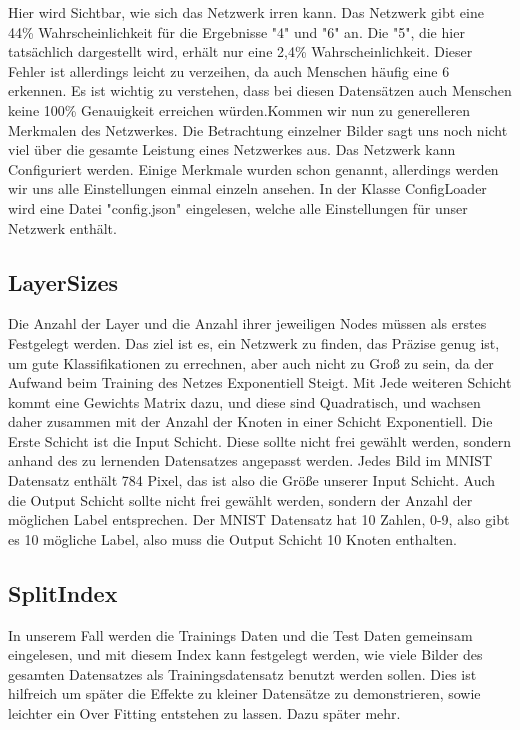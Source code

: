 \documentclass[12pt]{article}
\begin{document}
Hier wird Sichtbar, wie sich das Netzwerk irren kann. Das Netzwerk gibt eine 44\% Wahrscheinlichkeit für die Ergebnisse "4" und "6" an. Die "5", die hier tatsächlich dargestellt wird, erhält nur eine 2,4\% Wahrscheinlichkeit. Dieser Fehler ist allerdings leicht zu verzeihen, da auch Menschen häufig eine 6 erkennen. Es ist wichtig zu verstehen, dass bei diesen Datensätzen auch Menschen keine 100\% Genauigkeit erreichen würden.Kommen wir nun zu generelleren Merkmalen des Netzwerkes. Die Betrachtung einzelner Bilder sagt uns noch nicht viel über die gesamte Leistung eines Netzwerkes aus. Das Netzwerk kann Configuriert werden. Einige Merkmale wurden schon genannt, allerdings werden wir uns alle Einstellungen einmal einzeln ansehen. In der Klasse ConfigLoader wird eine Datei "config.json" eingelesen, welche alle Einstellungen für unser Netzwerk enthält.
\subsection{ LayerSizes}Die Anzahl der Layer und die Anzahl ihrer jeweiligen Nodes müssen als erstes Festgelegt werden. Das ziel ist es, ein Netzwerk zu finden, das Präzise genug ist, um gute Klassifikationen zu errechnen, aber auch nicht zu Groß zu sein, da der Aufwand beim Training des Netzes Exponentiell Steigt. Mit Jede weiteren Schicht kommt eine Gewichts Matrix dazu, und diese sind Quadratisch, und wachsen daher zusammen mit der Anzahl der Knoten in einer Schicht Exponentiell. 
Die Erste Schicht ist die Input Schicht. Diese sollte nicht frei gewählt werden, sondern anhand des zu lernenden Datensatzes angepasst werden. Jedes Bild im MNIST Datensatz enthält 784 Pixel, das ist also die Größe unserer Input Schicht.
Auch die Output Schicht sollte nicht frei gewählt werden, sondern der Anzahl der möglichen Label entsprechen. Der MNIST Datensatz hat 10 Zahlen, 0-9, also gibt es 10 mögliche Label, also muss die Output Schicht 10 Knoten enthalten.
\subsection{ SplitIndex}In unserem Fall werden die Trainings Daten und die Test Daten gemeinsam eingelesen, und mit diesem Index kann festgelegt werden, wie viele Bilder des gesamten Datensatzes als Trainingsdatensatz benutzt werden sollen. Dies ist hilfreich um später die Effekte zu kleiner Datensätze zu demonstrieren, sowie leichter ein Over Fitting entstehen zu lassen. Dazu später mehr.
\end{document}

